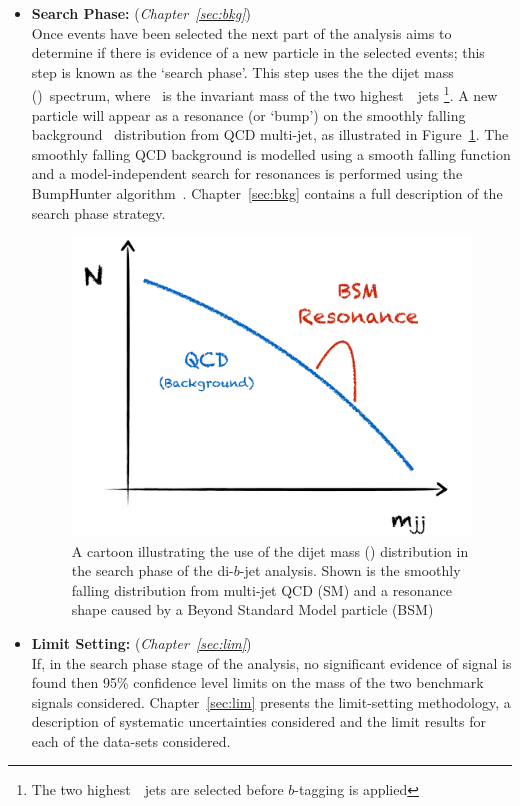 \begin{itemize}[leftmargin=*]
\item\textbf{Search Phase:} (\textit{Chapter~\ref{sec:bkg}})\\
  Once events have been selected the next part of the analysis aims to determine if there
  is evidence of a new particle in the selected events; this step is known as the `search phase'.
  This step uses the the dijet mass (\mjj)~spectrum, where \mjj~is the invariant mass of the two highest~\pT~jets
  \footnote{The two highest~\pT~jets are selected before $b$-tagging is applied}.
  A new particle will appear as a resonance (or `bump') on the smoothly falling background
  \mjj~distribution from QCD multi-jet, as illustrated in Figure~\ref{fig:evt-dijet_schem}.
  The smoothly falling QCD background is modelled using a smooth falling function and a
  model-independent search for resonances is performed using the {\sc BumpHunter} algorithm~\cite{dibjet-bh}.
  Chapter~\ref{sec:bkg} contains a full description of the search phase strategy.
  \vspace{-2mm}
  \begin{figure}[!hbt]
  \begin{center}
    \includegraphics[width=0.6\linewidth, angle=0]{figs/Dibjet/Gen/dijet_schem.pdf}
  \end{center}
  \vspace{-3mm}
  \caption{A cartoon illustrating the use of the dijet mass (\mjj) distribution in the search phase of the di-$b$-jet analysis.
            Shown is the smoothly falling distribution from multi-jet QCD (SM)
            and a resonance shape caused by a Beyond Standard Model particle (BSM)}
          \label{fig:evt-dijet_schem}
  \end{figure}
  \vspace{-5mm}
 
\item\textbf{Limit Setting:} (\textit{Chapter~\ref{sec:lim}})\\
  If, in the search phase stage of the analysis, no significant evidence of signal is found
  then 95\% confidence level limits on the mass of the two benchmark signals considered.
  Chapter~\ref{sec:lim} presents the limit-setting methodology,
  a description of systematic uncertainties considered
  and the limit results for each of the data-sets considered.

\end{itemize}

